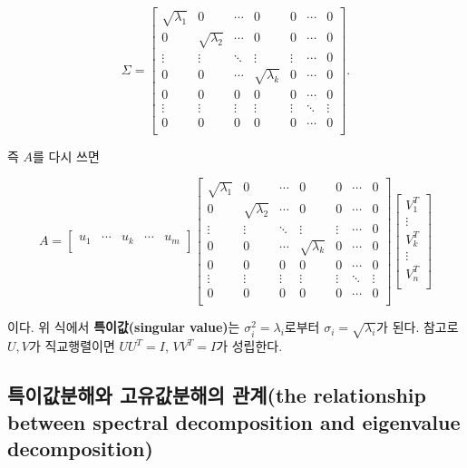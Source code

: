 \documentclass[b5paper,]{scrbook}
\theoremstyle{plain}
\theoremstyle{definition}
\numberwithin{equation}{section}
\begin{document}
\[
\Sigma=
\begin{bmatrix}
\sqrt{\lambda_{1}} & 0 & \cdots & 0 & 0 & \cdots & 0\\
0 & \sqrt{\lambda_{2}} & \cdots & 0 & 0 & \cdots & 0\\
\vdots & \vdots & \ddots & \vdots & \vdots & \cdots & 0\\
0 & 0 & \cdots & \sqrt{\lambda_{k}} & 0 & \cdots & 0\\
0 & 0 & 0 & 0 & 0 & \cdots & 0\\
\vdots & \vdots & \vdots & \vdots & \vdots & \ddots & \vdots\\
0 & 0 & 0 & 0 & 0 & \cdots & 0\\
\end{bmatrix}.
\]

즉 \(A\)를 다시 쓰면

\[
A=
\begin{bmatrix}
u_{1} & \cdots & u_{k} & \cdots & u_{m}\\
\end{bmatrix}
\begin{bmatrix}
\sqrt{\lambda_{1}} & 0 & \cdots & 0 & 0 & \cdots & 0\\
0 & \sqrt{\lambda_{2}} & \cdots & 0 & 0 & \cdots & 0\\
\vdots & \vdots & \ddots & \vdots & \vdots & \cdots & 0\\
0 & 0 & \cdots & \sqrt{\lambda_{k}} & 0 & \cdots & 0\\
0 & 0 & 0 & 0 & 0 & \cdots & 0\\
\vdots & \vdots & \vdots & \vdots & \vdots & \ddots & \vdots\\
0 & 0 & 0 & 0 & 0 & \cdots & 0\\
\end{bmatrix}
\begin{bmatrix}
V_{1}^{T}\\
\vdots \\
V_{k}^{T}\\
\vdots\\
V_{n}^{T}\\
\end{bmatrix}
\]

이다. 위 식에서 \textbf{특이값(singular value)}는 \(\sigma_{i}^{2}=\lambda_{i}\)로부터 \(\sigma_{i}=\sqrt{\lambda_{i}}\)가 된다. 참고로 \(U, V\)가 직교행렬이면 \(UU^{T}=I\), \(VV^{T}=I\)가 성립한다.

\hypertarget{--the-relationship-between-spectral-decomposition-and-eigenvalue-decomposition}{%
\subsection{특이값분해와 고유값분해의 관계(the relationship between spectral decomposition and eigenvalue decomposition)}\label{--the-relationship-between-spectral-decomposition-and-eigenvalue-decomposition}}
\end{document}
